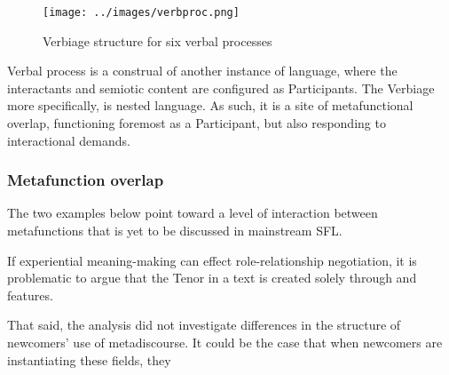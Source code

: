 
\begin{figure}[htb]
\centering
\texttt{[image: ../images/verbproc.png]}
\caption{Verbiage structure for six verbal processes}
\label{fig:sixverproc}
\end{figure}

Verbal process is a construal of another instance of language, where the interactants and semiotic content are configured as Participants. The Verbiage more specifically, is nested language. As such, it is a site of metafunctional overlap, functioning foremost as a Participant, but also responding to interactional demands.


\subsubsection{Metafunction overlap}

The two examples below point toward a level of interaction between metafunctions that is yet to be discussed in mainstream \gls{SFL}.

If experiential meaning-making can effect role-relationship negotiation, it is problematic to argue that the Tenor in a text is created solely through  and  features.

That said, the analysis did not investigate differences in the  structure of newcomers' use of metadiscourse. It could be the case that when newcomers are instantiating these fields, they 


